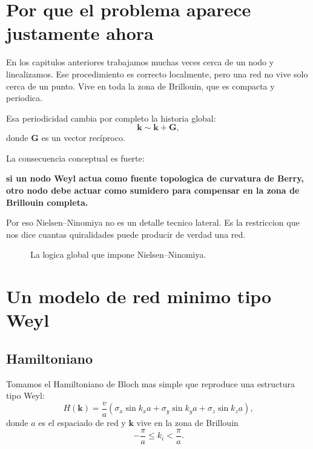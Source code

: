 \section{Por que el problema aparece justamente ahora}
En los capitulos anteriores trabajamos muchas veces cerca de un nodo y linealizamos. Ese procedimiento es correcto localmente, pero una red no vive solo cerca de un punto. Vive en toda la zona de Brillouin, que es compacta y periodica.

Esa periodicidad cambia por completo la historia global:
\begin{equation}
\bm{k}\sim \bm{k}+\bm{G},
\end{equation}
donde \(\bm{G}\) es un vector recíproco.

La consecuencia conceptual es fuerte:
\begin{displayquote}
\textbf{si un nodo Weyl actua como fuente topologica de curvatura de Berry, otro nodo debe actuar como sumidero para compensar en la zona de Brillouin completa.}
\end{displayquote}

Por eso Nielsen--Ninomiya no es un detalle tecnico lateral. Es la restriccion que nos dice cuantas quiralidades puede producir de verdad una red.

\begin{figure}[h!]
\centering
{}
\caption{La logica global que impone Nielsen--Ninomiya.}
\end{figure}

\section{Un modelo de red minimo tipo Weyl}
\subsection{Hamiltoniano}
Tomamos el Hamiltoniano de Bloch mas simple que reproduce una estructura tipo Weyl:
\begin{equation}
H(\bm{k}) = \frac{v}{a}\left(
\sigma_x \sin k_x a +
\sigma_y \sin k_y a +
\sigma_z \sin k_z a
\right),
\label{c27:eq:naiveweyl}
\end{equation}
donde \(a\) es el espaciado de red y \(\bm{k}\) vive en la zona de Brillouin
\begin{equation}
-\frac{\pi}{a}\le k_i < \frac{\pi}{a}.
\end{equation}


